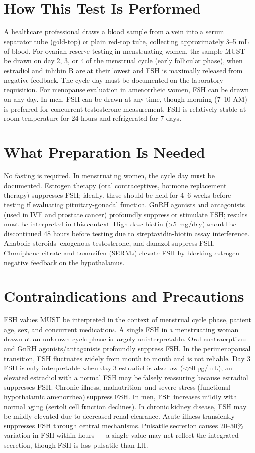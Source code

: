 \section*{How This Test Is Performed}
A healthcare professional draws a blood sample from a vein into a serum separator tube (gold-top) or plain red-top tube, collecting approximately 3--5 mL of blood. For ovarian reserve testing in menstruating women, the sample MUST be drawn on day 2, 3, or 4 of the menstrual cycle (early follicular phase), when estradiol and inhibin B are at their lowest and FSH is maximally released from negative feedback. The cycle day must be documented on the laboratory requisition. For menopause evaluation in amenorrheic women, FSH can be drawn on any day. In men, FSH can be drawn at any time, though morning (7--10 AM) is preferred for concurrent testosterone measurement. FSH is relatively stable at room temperature for 24 hours and refrigerated for 7 days.

\section*{What Preparation Is Needed}
No fasting is required. In menstruating women, the cycle day must be documented. Estrogen therapy (oral contraceptives, hormone replacement therapy) suppresses FSH; ideally, these should be held for 4--6 weeks before testing if evaluating pituitary-gonadal function. GnRH agonists and antagonists (used in IVF and prostate cancer) profoundly suppress or stimulate FSH; results must be interpreted in this context. High-dose biotin (>5 mg/day) should be discontinued 48 hours before testing due to streptavidin-biotin assay interference. Anabolic steroids, exogenous testosterone, and danazol suppress FSH. Clomiphene citrate and tamoxifen (SERMs) elevate FSH by blocking estrogen negative feedback on the hypothalamus.

\section*{Contraindications and Precautions}
FSH values MUST be interpreted in the context of menstrual cycle phase, patient age, sex, and concurrent medications. A single FSH in a menstruating woman drawn at an unknown cycle phase is largely uninterpretable. Oral contraceptives and GnRH agonists/antagonists profoundly suppress FSH. In the perimenopausal transition, FSH fluctuates widely from month to month and is not reliable. Day 3 FSH is only interpretable when day 3 estradiol is also low (<80 pg/mL); an elevated estradiol with a normal FSH may be falsely reassuring because estradiol suppresses FSH. Chronic illness, malnutrition, and severe stress (functional hypothalamic amenorrhea) suppress FSH. In men, FSH increases mildly with normal aging (sertoli cell function declines). In chronic kidney disease, FSH may be mildly elevated due to decreased renal clearance. Acute illness transiently suppresses FSH through central mechanisms. Pulsatile secretion causes 20--30\% variation in FSH within hours --- a single value may not reflect the integrated secretion, though FSH is less pulsatile than LH.

